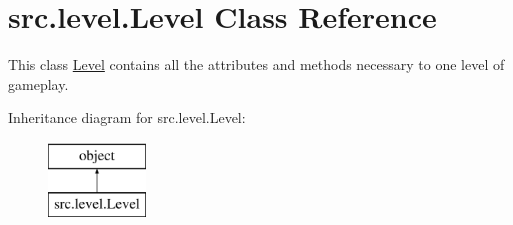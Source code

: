 \hypertarget{classsrc_1_1level_1_1_level}{}\section{src.\+level.\+Level Class Reference}
\label{classsrc_1_1level_1_1_level}


This class \hyperlink{classsrc_1_1level_1_1_level}{Level} contains all the attributes and methods necessary to one level of gameplay.  


Inheritance diagram for src.\+level.\+Level\+:\begin{figure}[H]
\begin{center}
\leavevmode
\includegraphics[height=2.000000cm]{classsrc_1_1level_1_1_level}
\end{center}
\end{figure}
